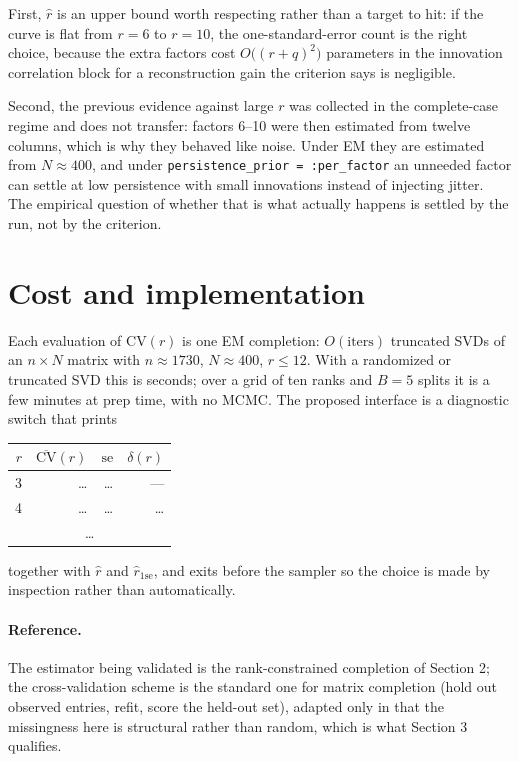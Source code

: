 \documentclass[11pt]{article}
\newcommand{\code}[1]{\texttt{#1}}
\begin{document}
First, $\hat r$ is an upper bound worth respecting rather than a target to hit:
if the curve is flat from $r=6$ to $r=10$, the one-standard-error count is the
right choice, because the extra factors cost
$O\bigl((r+q)^2\bigr)$ parameters in the innovation correlation block for a
reconstruction gain the criterion says is negligible.

Second, the previous evidence against large $r$ was collected in the
complete-case regime and does not transfer: factors 6--10 were then estimated
from twelve columns, which is why they behaved like noise. Under EM they are
estimated from $N \approx 400$, and under
\code{persistence\_prior = :per\_factor} an unneeded factor can settle at low
persistence with small innovations instead of injecting jitter. The empirical
question of whether that is what actually happens is settled by the run, not by
the criterion.

\section{Cost and implementation}

Each evaluation of $\mathrm{CV}(r)$ is one EM completion: $O(\mathrm{iters})$
truncated SVDs of an $n \times N$ matrix with $n \approx 1730$, $N \approx 400$,
$r \le 12$. With a randomized or truncated SVD this is seconds; over a grid of
ten ranks and $B = 5$ splits it is a few minutes at prep time, with no MCMC. The
proposed interface is a diagnostic switch that prints
\begin{center}
\begin{tabular}{rrrr}
\toprule
$r$ & $\overline{\mathrm{CV}}(r)$ & $\mathrm{se}$ & $\delta(r)$ \\
\midrule
3 & \dots & \dots & --- \\
4 & \dots & \dots & \dots \\
\multicolumn{4}{c}{\dots} \\
\bottomrule
\end{tabular}
\end{center}
together with $\hat r$ and $\hat r_{1\mathrm{se}}$, and exits before the sampler
so the choice is made by inspection rather than automatically.

\paragraph{Reference.} The estimator being validated is the rank-constrained
completion of Section 2; the cross-validation scheme is the standard one for
matrix completion (hold out observed entries, refit, score the held-out set),
adapted only in that the missingness here is structural rather than random, which
is what Section 3 qualifies.
\end{document}
